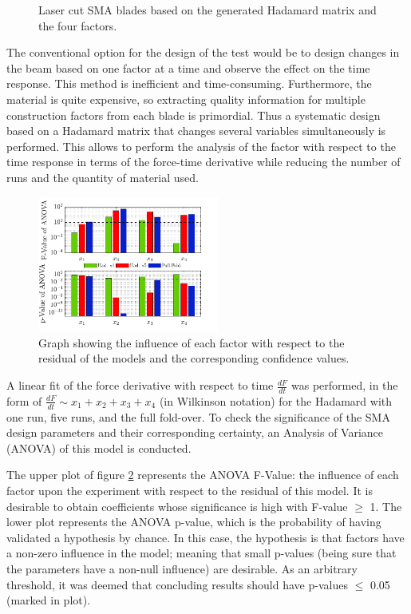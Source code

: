 \begin{figure}[H]
	\centering
	\def\svgwidth{0.5\columnwidth}
	
	\caption{Laser cut SMA blades based on the generated Hadamard matrix and the four factors.}
	\label{fig:BladeSample}
\end{figure}
The conventional option for the design of the test would be to design changes in the beam based on one factor at a time and observe the effect on the time response. This method is inefficient and time-consuming. Furthermore, the material is quite expensive, so extracting quality information for multiple construction factors from each blade is primordial. Thus a systematic design based on a Hadamard matrix that changes several variables simultaneously is performed. This allows to perform the analysis of the factor with respect to the time response in terms of the force-time derivative while reducing the number of runs and the quantity of material used.
\begin{figure}[H]
    \centering
    \includegraphics[width=0.53\textwidth]{Figures/fig_bar.pdf}
    \caption{Graph showing the influence of each factor with respect to the residual of the models and the corresponding confidence values.}
    \label{fig:bar1}
\end{figure}

A linear fit of the force derivative with respect to time $\frac{dF}{dt}$ was performed, in the form of $\frac{dF}{dt} \sim x_1+x_2+x_3+x_4 $ (in Wilkinson notation) for the Hadamard with one run, five runs, and the full fold-over. To check the significance of the SMA design parameters and their corresponding certainty, an Analysis of Variance (ANOVA) of this model is conducted.

The upper plot of figure \ref{fig:bar1} represents the ANOVA F-Value: the influence of each factor upon the experiment with respect to the residual of this model. It is desirable to obtain coefficients whose significance is high with F-value $\geq$ 1. The lower plot represents the ANOVA p-value, which is the probability of having validated a hypothesis by chance. In this case, the hypothesis is that factors have a non-zero influence in the model; meaning that small p-values (being sure that the parameters have a non-null influence) are desirable. As an arbitrary threshold, it was deemed that concluding results should have p-values $\leq$ 0.05 (marked in plot).

